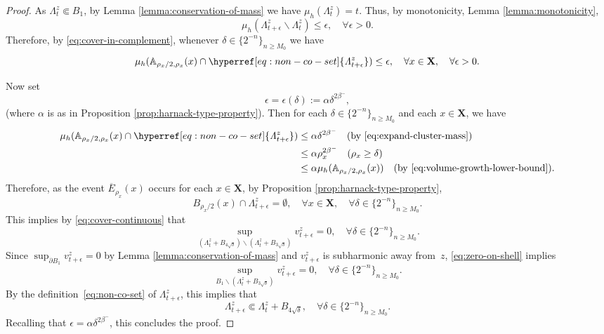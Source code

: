 \documentclass[12pt]{amsart}
\numberwithin{equation}{section}
\newcommand{\cluster}[2]{\hyperref[eq:non-co-set]{\mathit{\Lambda}^{#1}_{#2}}}
\newcommand{\odometer}[2]{\hyperref[eq:limit-odometer]{v^{#1}_{#2}}}
\begin{document}
\begin{proof}
		
		As ${\cluster{z}{t}} \Subset B_1$, by Lemma \ref{lemma:conservation-of-mass} we have $\mu_h({\cluster{z}{t}}) = t$.
		Thus, by monotonicity, Lemma \ref{lemma:monotonicity}, 
		\[
		\mu_h({\cluster{z}{t + \epsilon}} \backslash {\cluster{z}{t}}) \leq \epsilon, \quad \forall \epsilon > 0.
		\] 
		Therefore, by \eqref{eq:cover-in-complement}, whenever $\delta  \in \{2^{-n}\}_{n \geq M_0}$ we have
		\begin{equation} \label{eq:expand-cluster-mass}
		\mu_h(\A_{\rho_x/2,\rho_x}(x ) \cap {\cluster{z}{t+\epsilon}}) \leq \epsilon, \quad \forall x \in \mathbf{X}, \quad \forall \epsilon > 0.
		\end{equation}
		
		Now set 
		\[
		\epsilon = \epsilon(\delta) := \alpha \delta^{2 \beta^-},
		\]
		(where $\alpha$ is as in Proposition \ref{prop:harnack-type-property}). Then for each $\delta  \in \{2^{-n}\}_{n \geq M_0}$ and each $x \in \mathbf{X}$, we have
		\begin{align*}
		\mu_h(\A_{\rho_x/2,\rho_x}(x) \cap {\cluster{z}{t+\epsilon }}) &\leq \alpha \delta^{2 \beta^-} \quad \text{(by \eqref{eq:expand-cluster-mass})} \\
		&\leq \alpha \rho_x^{2 \beta^-} \quad \mbox{($\rho_x \geq \delta $)} \\
		&\leq \alpha \mu_h(\A_{\rho_x/2,\rho_x}(x)) \quad \mbox{(by \eqref{eq:volume-growth-lower-bound})}.
		\end{align*}
		Therefore, as the event $\overline E_{\rho_x }(x )$ occurs for each $x \in \mathbf{X}$, by Proposition \ref{prop:harnack-type-property},
		\[
		B_{\rho_x/2}(x ) \cap {\cluster{z}{t+\epsilon }} = \emptyset, \quad \forall x \in \mathbf{X}, \quad \forall \delta  \in \{2^{-n}\}_{n \geq M_0} .
		\]
		This implies by \eqref{eq:cover-continuous} that 
		\begin{equation} \label{eq:zero-on-shell}
		\sup_{({\cluster{z}{t}} + B_{4 \sqrt{\delta}}) \backslash ({\cluster{z}{t}} + B_{3 \sqrt{\delta}})} \odometer{z}{t+\epsilon } = 0, \quad \forall \delta  \in \{2^{-n}\}_{n \geq M_0}.
		\end{equation}
		Since $\sup_{\partial B_1} \odometer{z}{t+\epsilon } = 0$ by Lemma \ref{lemma:conservation-of-mass} and $\odometer{z}{t+\epsilon }$ is subharmonic away from~$z$, \eqref{eq:zero-on-shell} implies
		\begin{equation}
		\sup_{B_1 \backslash ({\cluster{z}{t}} + B_{3 \sqrt{\delta }})} \odometer{z}{t+\epsilon } = 0, \quad \forall \delta  \in \{2^{-n}\}_{n \geq M_0} .
		\end{equation}
		By the definition~\eqref{eq:non-co-set} of $\cluster{z}{t+\epsilon }$, this implies that
		\begin{equation}
		{\cluster{z}{t+\epsilon }} \Subset {\cluster{z}{t}} + B_{4\sqrt{\delta}}, \quad \forall \delta  \in \{2^{-n}\}_{n \geq M_0} .
		\end{equation}
		Recalling that $\epsilon = \alpha \delta^{2 \beta^-}$, this concludes the proof. 
	\end{proof}
	
\end{document}
